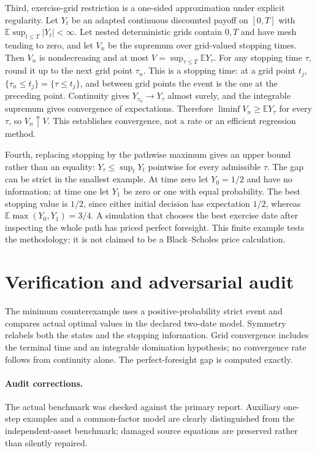 \documentclass[11pt]{article}
\begin{document}
Third, exercise-grid restriction is a one-sided approximation under explicit regularity. Let $Y_t$ be an adapted continuous discounted payoff on $[0,T]$ with $\mathbb E\sup_{t\leq T}|Y_t|<\infty$. Let nested deterministic grids contain $0,T$ and have mesh tending to zero, and let $V_n$ be the supremum over grid-valued stopping times. Then $V_n$ is nondecreasing and at most $V=\sup_{\tau\leq T}\mathbb EY_\tau$. For any stopping time $\tau$, round it up to the next grid point $\tau_n$. This is a stopping time: at a grid point $t_j$, $\{\tau_n\leq t_j\}=\{\tau\leq t_j\}$, and between grid points the event is the one at the preceding point. Continuity gives $Y_{\tau_n}\to Y_\tau$ almost surely, and the integrable supremum gives convergence of expectations. Therefore $\liminf V_n\geq\mathbb EY_\tau$ for every $\tau$, so $V_n\uparrow V$. This establishes convergence, not a rate or an efficient regression method.

Fourth, replacing stopping by the pathwise maximum gives an upper bound rather than an equality: $Y_\tau\leq\sup_tY_t$ pointwise for every admissible $\tau$. The gap can be strict in the smallest example. At time zero let $Y_0=1/2$ and have no information; at time one let $Y_1$ be zero or one with equal probability. The best stopping value is $1/2$, since either initial decision has expectation $1/2$, whereas $\mathbb E\max(Y_0,Y_1)=3/4$. A simulation that chooses the best exercise date after inspecting the whole path has priced perfect foresight. This finite example tests the methodology; it is not claimed to be a Black--Scholes price calculation.
\section{Verification and adversarial audit}
The minimum counterexample uses a positive-probability strict event and compares actual optimal values in the declared two-date model. Symmetry relabels both the states and the stopping information. Grid convergence includes the terminal time and an integrable domination hypothesis; no convergence rate follows from continuity alone. The perfect-foresight gap is computed exactly.
\paragraph{Audit corrections.} The actual benchmark was checked against the primary report. Auxiliary one-step examples and a common-factor model are clearly distinguished from the independent-asset benchmark; damaged source equations are preserved rather than silently repaired.
\end{document}
